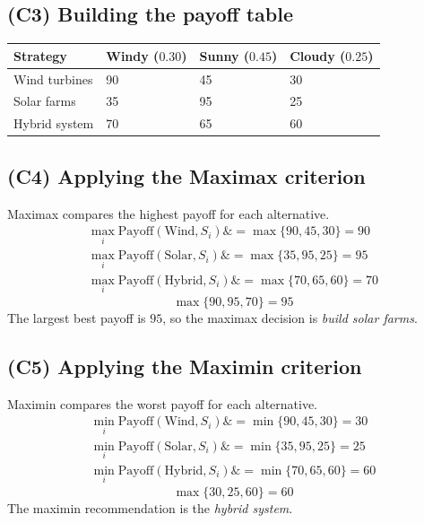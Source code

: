 \documentclass[11pt]{article}
\begin{document}
	\subsection*{(C3) Building the payoff table}
	
	\hypertarget{problem2-c3}{}
	
	\begin{center}
		\begin{tabular}{llll}
			\toprule
			Strategy & Windy
			($0.30$) & Sunny
			($0.45$) & Cloudy
			($0.25$) \\
			\midrule
			Wind turbines & 90 & 45 & 30 \\
			Solar farms & 35 & 95 & 25 \\
			Hybrid system & 70 & 65 & 60 \\
			\bottomrule
		\end{tabular}
	\end{center}
	
	\subsection*{(C4) Applying the Maximax criterion}
	
	\hypertarget{problem2-c4}{}
	
	Maximax compares the highest payoff for each alternative.
	\[
	\begin{aligned}
		\max_i \text{Payoff}(\text{Wind}, S_i) \&= \max\{90, 45, 30\} = 90 \\
		\max_i \text{Payoff}(\text{Solar}, S_i) \&= \max\{35, 95, 25\} = 95 \\
		\max_i \text{Payoff}(\text{Hybrid}, S_i) \&= \max\{70, 65, 60\} = 70
	\end{aligned}
	\]
	\[
	\max\{90, 95, 70\} = 95
	\]
The largest best payoff is $95$, so the maximax decision is \emph{build solar farms}.
	
	\subsection*{(C5) Applying the Maximin criterion}
	
	\hypertarget{problem2-c5}{}
	
	Maximin compares the worst payoff for each alternative.
	\[
	\begin{aligned}
		\min_i \text{Payoff}(\text{Wind}, S_i) \&= \min\{90, 45, 30\} = 30 \\
		\min_i \text{Payoff}(\text{Solar}, S_i) \&= \min\{35, 95, 25\} = 25 \\
		\min_i \text{Payoff}(\text{Hybrid}, S_i) \&= \min\{70, 65, 60\} = 60
	\end{aligned}
	\]
	\[
	\max\{30, 25, 60\} = 60
	\]
	The maximin recommendation is the \emph{hybrid system}.
	
\end{document}

